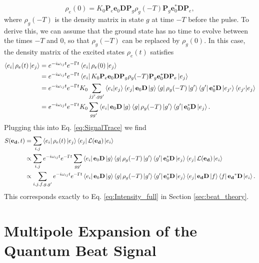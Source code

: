 \documentclass[11pt]{article}
\newcommand{\lag}{\mathcal{L}}
\begin{document}
\begin{appendices}
\begin{equation}
\rho_e(0) = K_0 \mathbf{P}_e \mathbf{e}_0 \mathbf{D} \mathbf{P}_g \rho_g(-T) \mathbf{P}_g \mathbf{e}_0^* \mathbf{D} \mathbf{P}_e,
\end{equation}
where $\rho_g(-T)$ is the density matrix in state $g$ at time $-T$ before the pulse. To derive this, we can assume that the ground state has no time to evolve between the times $-T$ and $0$, so that $\rho_g(-T)$ can be replaced by $\rho_g(0)$. In this case, the density matrix of the excited states $\rho_e(t)$ satisfies
\begin{align*}
\bra{e_i} \rho_e(t) \ket{e_j} 
&= e^{-i\omega_{ij}t} e^{-\Gamma t} \bra{e_i} \rho_e(0) \ket{e_j} \nonumber\\
&= e^{-i\omega_{ij}t} e^{-\Gamma t} \bra{e_i} K_0 \mathbf{P}_e \mathbf{e}_0 \mathbf{D} \mathbf{P}_g \rho_g(-T) \mathbf{P}_g \mathbf{e}_0^* \mathbf{D} \mathbf{P}_e \ket{e_j} \nonumber \\
&= e^{-i\omega_{ij}t} e^{-\Gamma t} K_0  \sum_{jj',gg'} \bra{e_i}\ket{e_j}\bra{e_j}\mathbf{e}_0 \mathbf{D} \ket{g}\bra{g} \rho_g(-T) \ket{g'}\bra{g'} \mathbf{e}_0^* \mathbf{D} \ket{e_{j'}}\bra{e_{j'}}\ket{e_j} \\
&= e^{-i\omega_{ij}t} e^{-\Gamma t} K_0  \sum_{gg'} \bra{e_i}\mathbf{e}_0 \mathbf{D} \ket{g}\bra{g} \rho_g(-T) \ket{g'}\bra{g'} \mathbf{e}_0^* \mathbf{D} \ket{e_{j}}.
\end{align*}
Plugging this into Eq. \ref{eq:SignalTrace} we find 
\begin{align}\label{eq:signal_full}
S(\mathbf{e_d},t) &= \sum_{i,j} \bra{e_i}\rho_e(t)\ket{e_j} \bra{e_j}\lag(\mathbf{e_d}) \ket{e_i} \nonumber\\
&\propto \sum_{i,j} e^{-i\omega_{ij}t} e^{-\Gamma t} \sum_{gg'} \bra{e_i}\mathbf{e}_0 \mathbf{D} \ket{g}\bra{g} \rho_g(-T) \ket{g'}\bra{g'} \mathbf{e}_0^* \mathbf{D} \ket{e_{j}} \bra{e_j}\lag(\mathbf{e_d}) \ket{e_i} \nonumber\\
&\propto \sum_{i,j,f,g,g'} e^{-i\omega_{ij}t} e^{-\Gamma t}  \bra{e_i}\mathbf{e}_0 \mathbf{D} \ket{g}\bra{g} \rho_g(-T) \ket{g'}\bra{g'} \mathbf{e}_0^* \mathbf{D} \ket{e_{j}} \bra{e_j}\mathbf{e_d} \mathbf{D}\ket{f}\bra{f}\mathbf{e_d}^* \mathbf{D} \ket{e_i}.
\end{align} 
This corresponds exactly to Eq. \ref{eq:Intensity_full} in Section \ref{sec:beat_theory}.



\section{Multipole Expansion of the Quantum Beat Signal}




\end{appendices}
\end{document}
